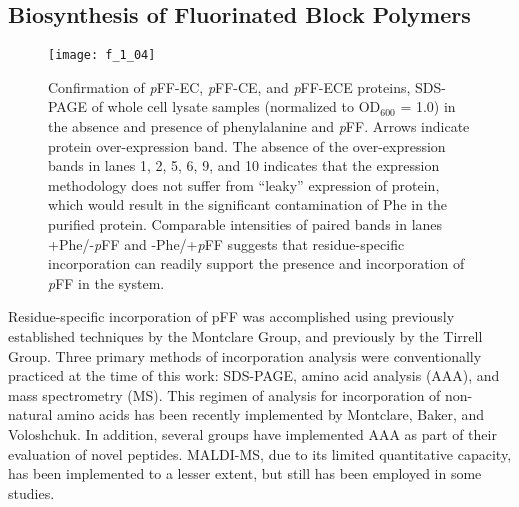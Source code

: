 \begin{refsection}
\subsection{Biosynthesis of Fluorinated Block Polymers}
\begin{figure}[h!] \centering \texttt{[image: f\_1\_04]}
    \caption[Confirmation of
        \emph{p}FF-EC, \emph{p}FF-CE, and \emph{p}FF-ECE proteins, SDS-PAGE of
        whole cell lysate samples (normalized to OD{$_{600}$} = 1.0) in the
        absence and presence of phenylalanine and \emph{p}FF. Arrows indicate
        protein over-expression band. The absence of the over-expression bands
        in lanes 1, 2, 5, 6, 9, and 10 indicates that the expression methodology
        does not suffer from ``leaky'' expression of protein, which would result
        in the significant contamination of Phe in the purified protein.
        Comparable intensities of paired bands in lanes +Phe/-\emph{p}FF and
        -Phe/+\emph{p}FF suggests that residue-specific incorporation can
        readily support the presence and incorporation of \emph{p}FF in the
    system.] {Confirmation of
        \emph{p}FF-EC, \emph{p}FF-CE, and \emph{p}FF-ECE proteins, SDS-PAGE of
        whole cell lysate samples (normalized to OD{$_{600}$} = 1.0) in the
        absence and presence of phenylalanine and \emph{p}FF. Arrows indicate
        protein over-expression band. The absence of the over-expression bands
        in lanes 1, 2, 5, 6, 9, and 10 indicates that the expression methodology
        does not suffer from ``leaky'' expression of protein, which would result
        in the significant contamination of Phe in the purified protein.
        Comparable intensities of paired bands in lanes +Phe/-\emph{p}FF and
        -Phe/+\emph{p}FF suggests that residue-specific incorporation can
        readily support the presence and incorporation of \emph{p}FF in the
    system.}
        \label{fig:expression_gel_pFF} \end{figure}
Residue-specific incorporation of pFF was accomplished using previously
established techniques by the Montclare Group, and previously by the Tirrell
Group.\cite{Yoshikawa1994,Sharma2000,Voloshchuk2009} Three primary methods of
incorporation analysis were conventionally practiced at the time of this work:
SDS-PAGE, amino acid analysis (AAA), and mass spectrometry (MS). 
This regimen of analysis for incorporation of non-natural amino acids has been
recently implemented by Montclare, Baker, and
Voloshchuk\cite{Voloshchuk2009,Panchenko2006,Baker2011}. In
addition, several groups have implemented AAA as part of their evaluation of novel
peptides. MALDI-MS, due to its limited quantitative capacity, has been
implemented to a lesser extent, but still has been employed in some
studies.\cite{Taki2001}


\end{refsection}
